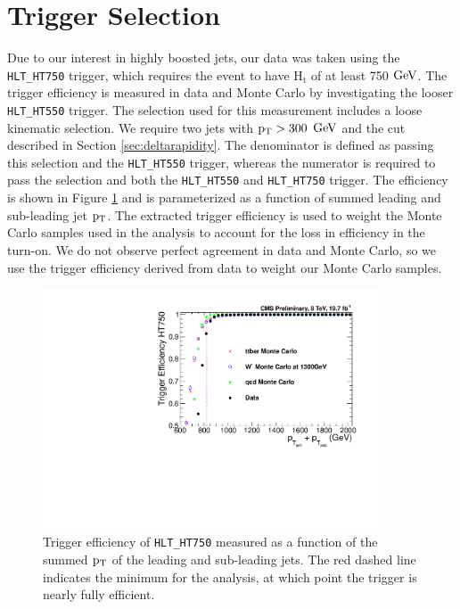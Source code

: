 \section{Trigger Selection}
\label{sec:trigger}
Due to our interest in highly boosted jets, our data was taken using the \texttt{HLT\_HT750} trigger, which requires the event to have $\mathrm{H_t}$ of at least 750 $\mathrm{GeV}$. 
The trigger efficiency is measured in data and Monte Carlo by investigating the looser \texttt{HLT\_HT550} trigger.  The selection used for this measurement includes a loose kinematic selection.  We require two jets 
with $\mathrm{p_{T}} > 300$ $\mathrm{GeV}$ and the cut described in Section \ref{sec:deltarapidity}.
The denominator is defined as passing this selection and the \texttt{HLT\_HT550} trigger, whereas the numerator is required to pass the selection and both the \texttt{HLT\_HT550} and \texttt{HLT\_HT750} trigger.  
The efficiency is shown in Figure \ref{figs:Trigger_Comparison_Ht} and is parameterized as a function of summed leading and sub-leading jet $\mathrm{p_{T}}$.  The extracted trigger efficiency is used to weight 
the Monte Carlo samples used in the analysis to account for the loss in efficiency in the turn-on.  We do not observe perfect agreement in data and Monte Carlo, 
so we use the trigger efficiency derived from data to weight our Monte Carlo samples.

\begin{figure}[htcb]
\centering
\includegraphics[width=0.9\textwidth]{AN-13-004/figs/Trigger_Comparison_Htdijet.pdf}
\caption{Trigger efficiency of \texttt{HLT\_HT750} measured as a function of the summed $\mathrm{p_{T}}$ of the leading and sub-leading jets.  The red dashed line indicates the minimum for the analysis, 
at which point the trigger is nearly fully efficient.}
\label{figs:Trigger_Comparison_Ht}
\end{figure}

